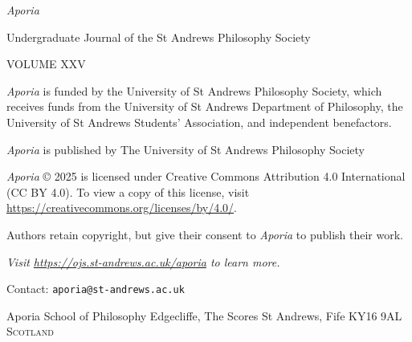 \thispagestyle{empty}

\noindent
{\huge\textit{Aporia}}

\vspace{1cm}

\normalsize
\noindent Undergraduate Journal of the St Andrews Philosophy
Society

\vspace{1cm}
\noindent VOLUME XXV


\vspace{3cm}
\vfill

\noindent \textit{Aporia} is funded by the University of St
Andrews Philosophy Society, which receives funds from the
University of St Andrews
Department of Philosophy, the University of St Andrews
Students’ Association, and independent benefactors.

\noindent
\textit{Aporia} is published by The University of St Andrews
Philosophy Society

\vspace{1cm}
\noindent
\textit{Aporia} © 2025 is licensed under Creative Commons
Attribution 4.0 International (CC BY 4.0). To view a copy of
this license, visit
\url{https://creativecommons.org/licenses/by/4.0/}.

\vspace{1cm}
\noindent
Authors retain copyright, but give their consent to
\textit{Aporia} to publish their work.

\vspace{2cm}
\begin{multicols}{2}
\noindent
\textit{Visit \url{https://ojs.st-andrews.ac.uk/aporia} to learn more.}
\vspace{2cm}

\noindent
Contact: \texttt{aporia@st-andrews.ac.uk}

\columnbreak
\noindent
Aporia\newline
School of Philosophy\newline
Edgecliffe, The Scores\newline
St Andrews, Fife\newline
KY16 9AL\newline
\textsc{Scotland}
\end{multicols}
